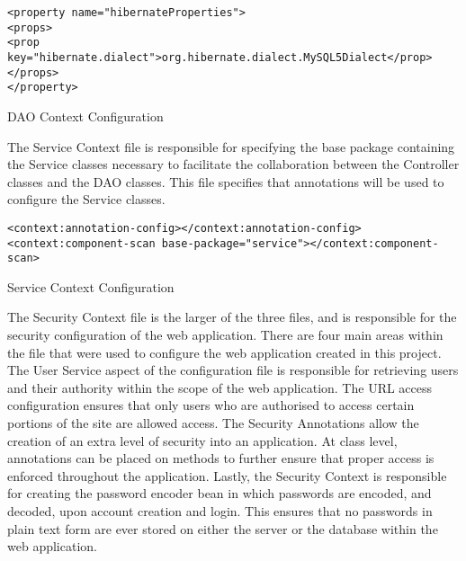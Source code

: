 \begin{table}[H]
\begin{lstlisting}
<property name="hibernateProperties">
<props>
<prop key="hibernate.dialect">org.hibernate.dialect.MySQL5Dialect</prop>
</props>
</property>
\end{lstlisting}
\caption{DAO Context Configuration}
\end{table}

The Service Context file is responsible for specifying the base package containing the Service classes necessary to facilitate the collaboration between the Controller classes and the DAO classes. This file specifies that annotations will be used to configure the Service classes.\newline

\begin{table}[H]
\begin{lstlisting}
<context:annotation-config></context:annotation-config>
<context:component-scan base-package="service"></context:component-scan>
\end{lstlisting}
\caption{Service Context Configuration}
\end{table}

The Security Context file is the larger of the three files, and is responsible for the security configuration of the web application. There are four main areas within the file that were used to configure the web application created in this project. \newline The User Service aspect of the configuration file is responsible for retrieving users and their authority within the scope of the web application. \newline The URL access configuration ensures that only users who are authorised to access certain portions of the site are allowed access. \newline The Security Annotations allow the creation of an extra level of security into an application. At class level, annotations can be placed on methods to further ensure that proper access is enforced throughout the application. \newline Lastly, the Security Context is responsible for creating the password encoder bean in which passwords are encoded, and decoded, upon account creation and login. This ensures that no passwords in plain text form are ever stored on either the server or the database within the web application. \newline

